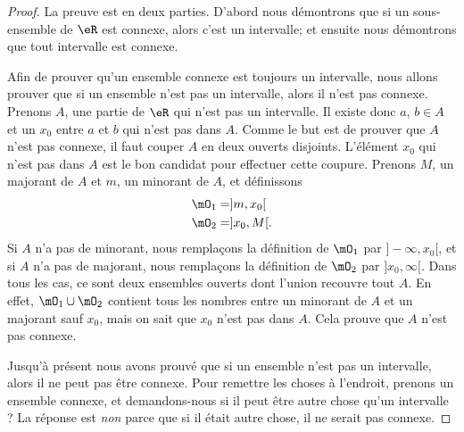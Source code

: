 \begin{proof}
	La preuve est en deux parties. D'abord nous démontrons que si un sous-ensemble de \( \eR\) est connexe, alors c'est un intervalle; et ensuite nous démontrons que tout intervalle est connexe.

	Afin de prouver qu'un ensemble connexe est toujours un intervalle, nous allons prouver que si un ensemble n'est pas un intervalle, alors il n'est pas connexe. Prenons \( A\), une partie de \( \eR\) qui n'est pas un intervalle. Il existe donc \( a\), \( b\in A\) et un \( x_0\) entre \( a\) et \( b\) qui n'est pas dans \( A\). Comme le but est de prouver que \( A\) n'est pas connexe, il faut couper \( A\) en deux ouverts disjoints. L'élément \( x_0\) qui n'est pas dans \( A\) est le bon candidat pour effectuer cette coupure. Prenons \( M\), un majorant de \( A\) et \( m\), un minorant de \( A\), et définissons
	\begin{align*}
		\mO_1 & =]m,x_0[  \\
		\mO_2 & =]x_0,M[.
	\end{align*}
	Si \( A\) n'a pas de minorant, nous remplaçons la définition de \( \mO_1\) par \( ]-\infty,x_0[\), et si \( A\) n'a pas de majorant, nous remplaçons la définition de \( \mO_2\) par \( ]x_0,\infty[\). Dans tous les cas, ce sont deux ensembles ouverts dont l'union recouvre tout \( A\). En effet, \( \mO_1\cup \mO_2\) contient tous les nombres entre un minorant de \( A\) et un majorant sauf \( x_0\), mais on sait que \( x_0\) n'est pas dans \( A\). Cela prouve que \( A\) n'est pas connexe.

	Jusqu'à présent nous avons prouvé que si un ensemble n'est pas un intervalle, alors il ne peut pas être connexe. Pour remettre les choses à l'endroit, prenons un ensemble connexe, et demandons-nous si il peut être autre chose qu'un intervalle ? La réponse est \emph{non} parce que si il était autre chose, il ne serait pas connexe.


\end{proof}
